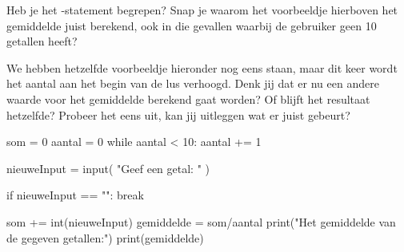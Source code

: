 \begin{letsTryOut}
	Heb je het -statement begrepen?
	Snap je waarom het voorbeeldje hierboven het gemiddelde juist berekend,
	ook in die gevallen waarbij de gebruiker geen 10 getallen heeft?
	\par
	We hebben hetzelfde voorbeeldje hieronder nog eens staan,
	maar dit keer wordt het aantal aan het begin van de lus verhoogd.
	\newline
	Denk jij dat er nu een andere waarde voor het gemiddelde berekend gaat worden?
	Of blijft het resultaat hetzelfde?
	\newline
	Probeer het eens uit,
	kan jij uitleggen wat er juist gebeurt?
\begin{pyEnv}
som = 0
aantal = 0
while aantal < 10:
	aantal += 1
	
	nieuweInput = input(
		"Geef een getal: "
	)

	if nieuweInput == "":
		break
	
	som += int(nieuweInput)
gemiddelde = som/aantal
print("Het gemiddelde van de gegeven getallen:")
print(gemiddelde)
\end{pyEnv}
\end{letsTryOut}

\subsection{}

